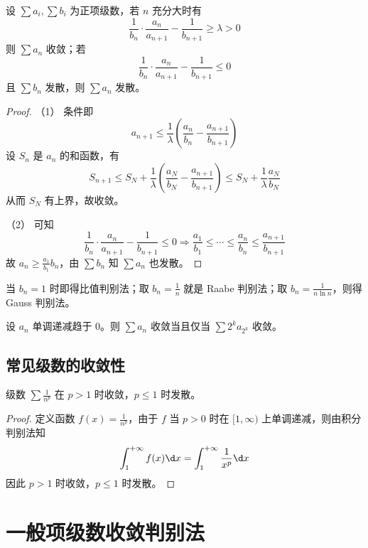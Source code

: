 \begin{theorem}[Kummer]
	设 $\sum a_i, \sum b_i$ 为正项级数，若 $n$ 充分大时有
	\[ \frac{1}{b_n} \cdot \frac{a_n}{a_{n+1}} - \frac{1}{b_{n+1}} \geqslant \lambda > 0 \]
	则 $\sum a_n$ 收敛；若
	\[ \frac{1}{b_n} \cdot \frac{a_n}{a_{n+1}} - \frac{1}{b_{n+1}} \leqslant 0 \]
	且 $\sum b_n$ 发散，则 $\sum a_n$ 发散。
\end{theorem}

\begin{proof}
	（1） 条件即
	\[ a_{n+1} \leqslant \frac{1}{\lambda} \left( \frac{a_n}{b_n} - \frac{a_{n+1}}{b_{n+1}} \right) \]
	设 $S_n$ 是 $a_n$ 的和函数，有
	\[ S_{n+1} \leqslant S_N +\frac{1}{\lambda} \left( \frac{a_N}{b_N} - \frac{a_{n+1}}{b_{n+1}} \right) \leqslant S_N + \frac{1}{\lambda} \frac{a_N}{b_N} \]
	从而 $S_N$ 有上界，故收敛。
	
	（2） 可知
	\[ \frac{1}{b_n} \cdot \frac{a_n}{a_{n+1}} - \frac{1}{b_{n+1}} \leqslant 0 \Longrightarrow \frac{a_1}{b_1} \leqslant \cdots \leqslant \frac{a_n}{b_n} \leqslant \frac{a_{n+1}}{b_{n+1}} \]
	故 $a_n \geqslant \frac{a_1}{b_1} b_n$，由 $\sum b_n$ 知 $\sum a_n$ 也发散。
\end{proof}

当 $b_n = 1$ 时即得比值判别法；取 $b_n = \frac{1}{n}$ 就是 Raabe 判别法；取 $b_n = \frac{1}{n \ln n}$，则得 Gauss 判别法。

\begin{theorem}
	设 $a_n$ 单调递减趋于 $0$。则 $\sum a_n$ 收敛当且仅当 $\sum 2^k a_{2^k}$ 收敛。
\end{theorem}

\subsection{常见级数的收敛性}

\begin{theorem}
	级数 $\sum \frac{1}{n^p}$ 在 $p > 1$ 时收敛，$p \leqslant 1$ 时发散。
\end{theorem}

\begin{proof}
	定义函数 $f(x) = \frac{1}{n^p}$，由于 $f$ 当 $p > 0$ 时在 $[1, \infty)$ 上单调递减，则由积分判别法知
	\[ \int_{1}^{+\infty} f(x) \d x = \int_{1}^{+\infty} \frac{1}{x^p} \d x \]
	因此 $p > 1$ 时收敛，$p \leqslant 1$ 时发散。
\end{proof}

\section{一般项级数收敛判别法}

